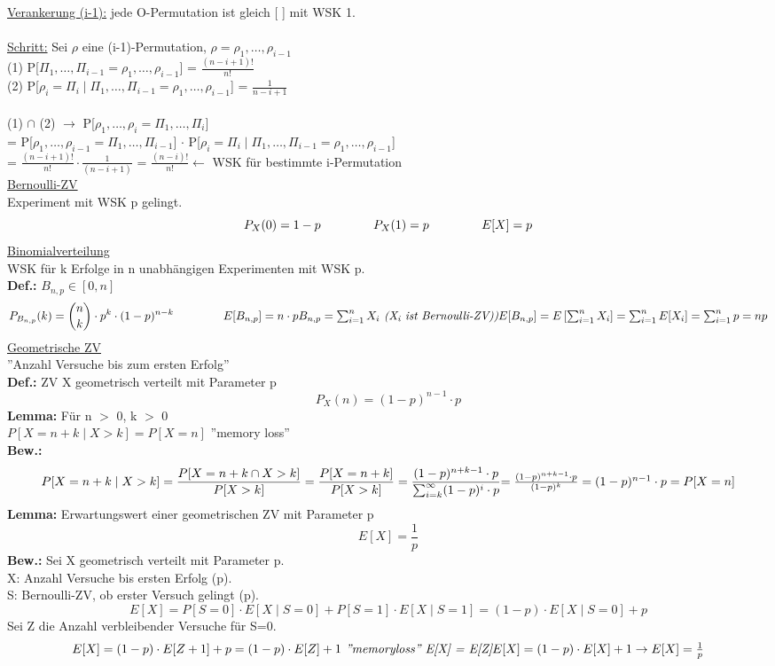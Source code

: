\documentclass{article}
\begin{document}
	\underline{Verankerung (i-1):} jede O-Permutation ist gleich [ ] mit WSK 1. \\
	\\
	\underline{Schritt:} Sei $\rho$ eine (i-1)-Permutation, $\rho = \rho_1, \ldots , \rho_{i-1}$ \\
	(1) P[$\Pi_1, \ldots , \Pi_{i-1} = \rho_1, \ldots , \rho_{i-1}$] = $\frac{(n-i+1)!}{n!}$ \\
	(2) P[$\rho_i=\Pi_i\mid \Pi_1, \ldots , \Pi_{i-1} = \rho_1, \ldots , \rho_{i-1}$] = $\frac{1}{n-i+1}$ \\
	\\
	(1) $\cap$ (2) $\rightarrow$ P[$\rho_1, \ldots , \rho_i=\Pi_1, \ldots , \Pi_i$] \\
	= P[$\rho_1, \ldots , \rho_{i-1}=\Pi_1, \ldots , \Pi_{i-1}$] $\cdot$ P[$\rho_i=\Pi_i\mid \Pi_1, \ldots , \Pi_{i-1} = \rho_1, \ldots , \rho_{i-1}$] \\
	= $\frac{(n-i+1)!}{n!} \cdot \frac{1}{(n-i+1)}$ = $\frac{(n-i)!}{n!} \leftarrow$ WSK für bestimmte i-Permutation  \\
	\newpage
	\underline{Bernoulli-ZV} \\
	Experiment mit WSK p gelingt. \\
	\[
		P_X(0) = 1-p \hspace{1,5cm}
		P_X(1) = p \hspace{1,5cm}
		E[X] = p
	\]
	\underline{Binomialverteilung} \\
	WSK für k Erfolge in n unabhängigen Experimenten mit WSK p. \\
	\textbf{Def.:} $B_{n,p} \in [0,n]$
	\[
		P_{B_{n,p}}(k) = \binom{n}{k} \cdot p^k \cdot (1-p)^{n-k} \hspace{1,5cm}
		E[B_{n,p}] = n \cdot p $$ $$
		B_{n,p} = \sum_{i=1}^{n} X_i  \textit{ (X\textsubscript{i} ist Bernoulli-ZV))} $$ $$
		E[B_{n,p}] = E\left[\sum_{i=1}^{n} X_i\right] = \sum_{i=1}^{n} E[X_i] = \sum_{i=1}^{n} p = np
	\]
	\underline{Geometrische ZV} \\
	''Anzahl Versuche bis zum ersten Erfolg'' \\
	\textbf{Def.:} ZV X geometrisch verteilt mit Parameter p
	\[
		P_X(n) = (1-p)^{n-1} \cdot p
	\]
	\textbf{Lemma:} Für n $>$ 0, k $>$ 0 \\
	$P[X=n+k\mid X>k] = P[X=n]$ ''memory loss'' \\
	\textbf{Bew.:}
	\[
		P[X=n+k\mid X>k] = \frac{P[X=n+k \cap X>k]}{P[X>k]} = \frac{P[X=n+k]}{P[X>k]} = \frac{(1-p)^{n+k-1} \cdot p}{\sum_{i=k}^{\infty}(1-p)^i \cdot p} $$ $$
		= \frac{(1-p)^{n+k-1} \cdot p}{(1-p)^k} = (1-p)^{n-1} \cdot p = P[X=n]
	\]
	\textbf{Lemma:} Erwartungswert einer geometrischen ZV mit Parameter p
	\[
		E[X] = \frac{1}{p}
	\]
	\textbf{Bew.:} Sei X geometrisch verteilt mit Parameter p. \\
	X: Anzahl Versuche bis ersten Erfolg (p). \\
	S: Bernoulli-ZV, ob erster Versuch gelingt (p). \\
	\[
		E[X] = P[S=0] \cdot E[X\mid S=0] + P[S=1] \cdot E[X\mid S=1] = (1-p) \cdot E[X\mid S=0] + p
	\]
	Sei Z die Anzahl verbleibender Versuche für S=0. \\
	\[
		E[X] = (1-p) \cdot E[Z+1] + p = (1-p) \cdot E[Z] + 1 
		\textit{ ''memoryloss'' E[X] = E[Z]} $$ $$
		E[X] = (1-p) \cdot E[X] + 1 \rightarrow E[X] = \frac{1}{p}
	\]
 
\end{document}
